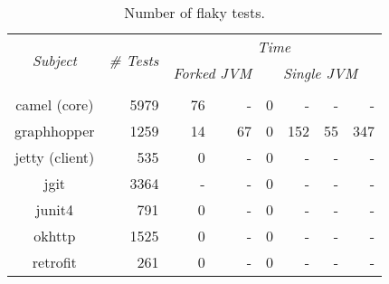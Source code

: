 \begin{table*}[t]
  \centering
  \begin{tabular}{|c|r|r|r|r|r|r|r|}
    \hline
    \multirow{2}{*}{\emph{Subject}} & \multirow{2}{*}{\emph{\# Tests}} &  \multicolumn{6}{c|}{\emph{Time}}\\
    \cline{3-8}
    & & \multicolumn{2}{c|}{\emph{Forked JVM}} & \multicolumn{4}{c|}{\emph{Single JVM}}   \\
    \cline{3-8}
    & & \multicolumn{1}{c|}{\Seq{}} & \multicolumn{1}{c|}{\ParClassSeqMeth{}} & \multicolumn{1}{c|}{\Seq{}} & \multicolumn{1}{c|}{\ParClassSeqMeth{}} & \multicolumn{1}{c|}{\SeqClassParMeth{}} & \multicolumn{1}{c|}{\ParClassParMeth{}}\\     \hline 
    camel (core) & 5979 & 76 & - & 0 & - & - & - \\
    \hline
    graphhopper & 1259 & 14 & 67 & 0 & 152 & 55 & 347 \\
    \hline
    jetty (client) & 535 & 0 & - & 0 & - & - & - \\
    \hline
    jgit & 3364 & - & - & 0 & - & - & - \\
    \hline
    junit4 & 791 & 0 & - & 0 & - & - & - \\
    \hline
    okhttp & 1525 & 0 & - & 0 & - & - & - \\
    \hline
    retrofit & 261 & 0 & - & 0 & - & - & - \\
    \hline
  \end{tabular}
  \caption{\label{table:failures}Number of flaky tests.}
\end{table*}

